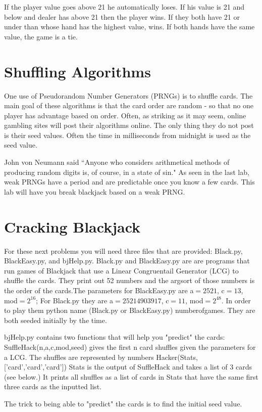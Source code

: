 If the player value goes above 21 he automatically loses. If his value is 21 and below and dealer has above 21 then the player wins. If they both have 21 or under than whose hand has the highest value, wins. If both hands have the same value, the game is a tie.

\section*{Shuffling Algorithms}

One use of Pseudorandom Number Generators (PRNGs) is to shuffle cards. The main goal of these algorithms is that the card order are random - so that no one player has advantage  based on order. Often, as striking as it may seem, online gambling sites will post their algorithms online. The only thing they do not post is their seed values. Often the time in milliseconds from midnight is used as the seed value.

John von Neumann said ``Anyone who considers arithmetical methods of producing random digits is, of course, in a state of sin." As seen in the last lab, weak PRNGs have a period and are predictable once you know a few cards. This lab will have you break blackjack based on a weak PRNG.

\section*{Cracking Blackjack}
For these next problems you will need three files that are provided: Black.py, BlackEasy.py, and bjHelp.py.  Black.py and BlackEasy.py are are programs that run games of Blackjack that use a Linear Congruentail Generator (LCG) to shuffle the cards. They print out 52 numbers and the argsort of those numbers is the order of the cards.The parameters for BlackEasy.py are a$=2521$, c$=13$, mod$=2^{16}$; For Black.py they are a$=25214903917$, c$=11$, mod$=2^{48}$. In order to play them python name (Black.py or BlackEasy.py) numberofgames. They are both seeded initially by the time.

bjHelp.py contains two functions that will help you "predict" the cards:
SuffleHack(n,a,c,mod,seed) gives the first n card shuffles given the parameters for a LCG. The shuffles are represented by numbers 
Hacker(Stats,['card','card','card']) Stats is the output of SuffleHack and takes a list of 3 cards (see below.) It prints all shuffles as a list of cards in Stats that have the same first three cards as the inputted list.

The trick to being able to "predict" the cards is to find the initial seed value.


